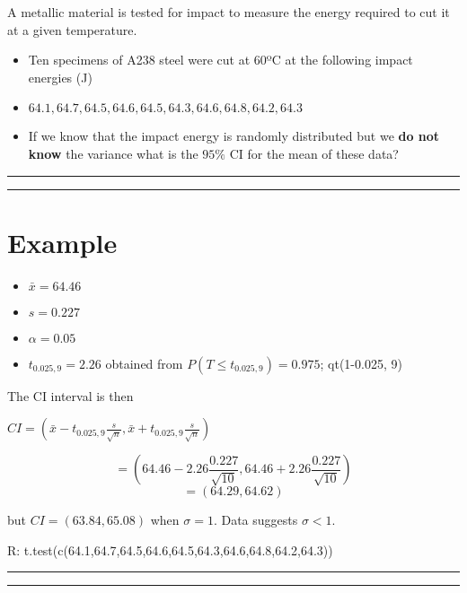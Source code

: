 \documentclass[
]{book}
\providecommand{\tightlist}{%
  \setlength{\itemsep}{0pt}\setlength{\parskip}{0pt}}
\begin{document}
A metallic material is tested for impact to measure the energy required to cut it at a given temperature.

\begin{itemize}
\item
  Ten specimens of A238 steel were cut at 60ºC at the following impact energies (J)
\item
  \(64.1, 64.7, 64.5, 64.6, 64.5, 64.3, 64.6, 64.8, 64.2, 64.3\)
\item
  If we know that the impact energy is randomly distributed but we \textbf{do not know} the variance what is the \(95\%\) CI for the mean of these data?
\end{itemize}

\begin{center}\rule{0.5\linewidth}{0.5pt}\end{center}

\begin{center}\rule{0.5\linewidth}{0.5pt}\end{center}

\hypertarget{example-20}{%
\section{Example}\label{example-20}}

\begin{itemize}
\tightlist
\item
  \(\bar{x}=64.46\)
\item
  \(s=0.227\)
\item
  \(\alpha=0.05\)
\item
  \(t_{0.025,9}=2.26\) obtained from \(P(T \leq t_{0.025,9})=0.975\); qt(1-0.025, 9)
\end{itemize}

The CI interval is then

\(CI=(\bar{x}- t_{0.025,9}\frac{s}{\sqrt{n}},\bar{x}+t_{0.025,9} \frac{s}{\sqrt{n}})\)

\[=(64.46-2.26 \frac{0.227}{\sqrt{10}},64.46+2.26 \frac{0.227}{\sqrt{10}})\] \[=(64.29,64.62)\]

but \(CI=(63.84,65.08)\) when \(\sigma=1\). Data suggests \(\sigma<1\).

R: t.test(c(64.1,64.7,64.5,64.6,64.5,64.3,64.6,64.8,64.2,64.3))

\begin{center}\rule{0.5\linewidth}{0.5pt}\end{center}

\begin{center}\rule{0.5\linewidth}{0.5pt}\end{center}
\end{document}

